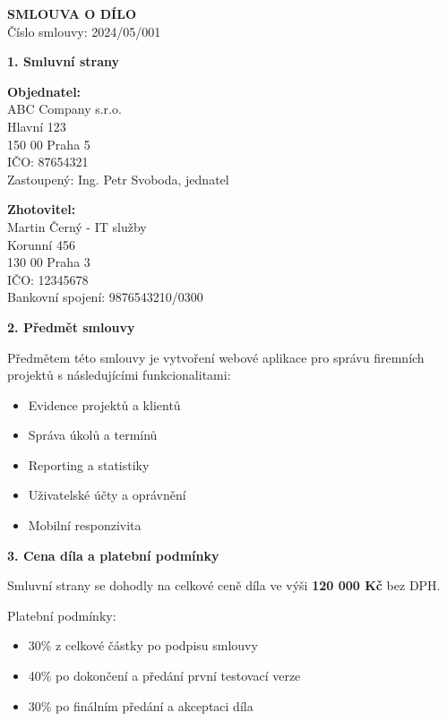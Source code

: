 \documentclass[a4paper,12pt]{article}
\begin{document}
\begin{center}
    {\Large \textbf{SMLOUVA O DÍLO}} \\
    \vspace{0.5cm}
    Číslo smlouvy: 2024/05/001
\end{center}

\vspace{1cm}

\textbf{1. Smluvní strany}

\textbf{Objednatel:} \\
ABC Company s.r.o. \\
Hlavní 123 \\
150 00 Praha 5 \\
IČO: 87654321 \\
Zastoupený: Ing. Petr Svoboda, jednatel \\

\vspace{0.5cm}

\textbf{Zhotovitel:} \\
Martin Černý - IT služby \\
Korunní 456 \\
130 00 Praha 3 \\
IČO: 12345678 \\
Bankovní spojení: 9876543210/0300 \\

\vspace{1cm}

\textbf{2. Předmět smlouvy}

Předmětem této smlouvy je vytvoření webové aplikace pro správu firemních projektů s následujícími funkcionalitami:
\begin{itemize}
    \item Evidence projektů a klientů
    \item Správa úkolů a termínů
    \item Reporting a statistiky
    \item Uživatelské účty a oprávnění
    \item Mobilní responzivita
\end{itemize}

\vspace{0.5cm}

\textbf{3. Cena díla a platební podmínky}

Smluvní strany se dohodly na celkové ceně díla ve výši \textbf{120 000 Kč} bez DPH.

Platební podmínky:
\begin{itemize}
    \item 30\% z celkové částky po podpisu smlouvy
    \item 40\% po dokončení a předání první testovací verze
    \item 30\% po finálním předání a akceptaci díla
\end{itemize}
\end{document}
